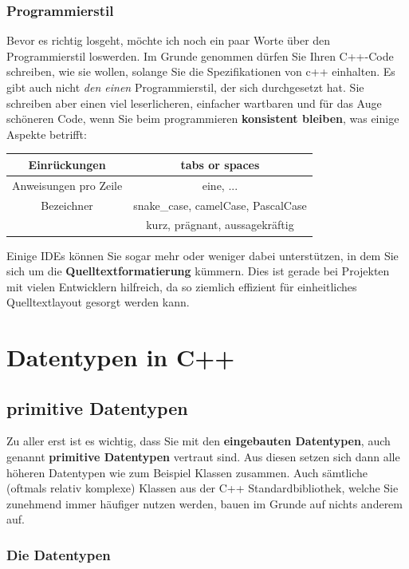 \documentclass[a4paper]{report}
\begin{document}
\subsection{Programmierstil}
Bevor es richtig losgeht, möchte ich noch ein paar Worte über den Programmierstil loswerden. Im Grunde genommen dürfen Sie Ihren C++-Code schreiben, wie sie wollen, solange Sie die Spezifikationen von c++ einhalten. Es gibt auch nicht \textit{den einen} Programmierstil, der sich durchgesetzt hat. Sie schreiben aber einen viel leserlicheren, einfacher wartbaren und für das Auge schöneren Code, wenn Sie beim programmieren \textbf{konsistent bleiben}, was einige Aspekte betrifft:
\begin{center}
	\begin{tabular}{|c||c|}
		\hline
		Einrückungen	&	tabs or spaces \\ \hline
		Anweisungen pro Zeile & eine, ... \\ \hline
		Bezeichner		&	snake\_case, camelCase, PascalCase \\
		& kurz, prägnant, aussagekräftig \\ \hline
	\end{tabular}
\end{center}
Einige IDEs können Sie sogar mehr oder weniger dabei unterstützen, in dem Sie sich um die \textbf{Quelltextformatierung} kümmern. Dies ist gerade bei Projekten mit vielen Entwicklern hilfreich, da so ziemlich effizient für einheitliches Quelltextlayout gesorgt werden kann.

\chapter{Datentypen in C++} \label{real_start}

\section{primitive Datentypen}
Zu aller erst ist es wichtig, dass Sie mit den \textbf{eingebauten Datentypen}, auch genannt \textbf{primitive Datentypen} vertraut sind. Aus diesen setzen sich dann alle höheren Datentypen wie zum Beispiel Klassen zusammen. Auch sämtliche (oftmals relativ komplexe) Klassen aus der C++ Standardbibliothek, welche Sie zunehmend immer häufiger nutzen werden, bauen im Grunde auf nichts anderem auf.

\subsection{Die Datentypen}
\end{document}
